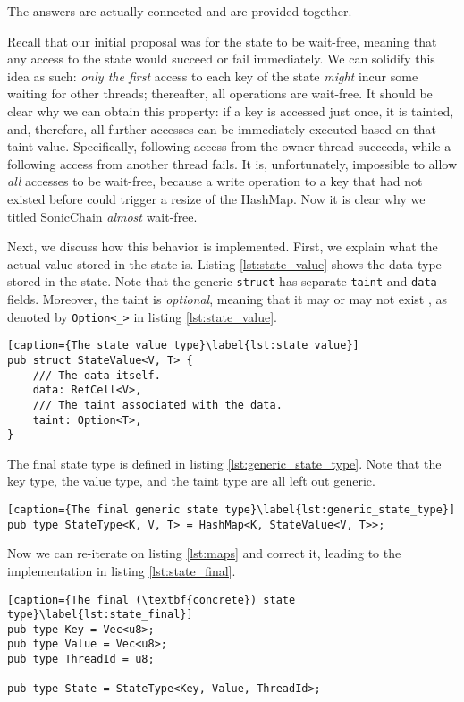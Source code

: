 The answers are actually connected and are provided together.

Recall that our initial proposal was for the state to be wait-free, meaning that any access to the
state would succeed or fail immediately. We can solidify this idea as such: \textit{only the first}
access to each key of the state \textit{might} incur some waiting for other threads; thereafter, all
operations are wait-free. It should be clear why we can obtain this property: if a key is accessed
just once, it is tainted, and, therefore, all further accesses can be immediately executed based on
that taint value. Specifically, following access from the owner thread succeeds, while a following
access from another thread fails. It is, unfortunately, impossible to allow \textit{all} accesses to
be wait-free, because a write operation to a key that had not existed before could trigger a resize
of the HashMap. Now it is clear why we titled SonicChain \textit{almost} wait-free.

Next, we discuss how this behavior is implemented. First, we explain what the actual value stored in
the state is. Listing \ref{lst:state_value} shows the data type stored in the state. Note that the
generic \texttt{struct} has separate \texttt{taint} and \texttt{data} fields. Moreover, the taint is
\textit{optional}, meaning that it may or may not exist , as denoted by \texttt{Option<\_>} in listing \ref{lst:state_value}.

\begin{lstlisting}[caption={The state value type}\label{lst:state_value}]
pub struct StateValue<V, T> {
    /// The data itself.
    data: RefCell<V>,
    /// The taint associated with the data.
    taint: Option<T>,
}
\end{lstlisting}

The final state type is defined in listing \ref{lst:generic_state_type}. Note that the key type, the value
type, and the taint type are all left out generic.

\begin{lstlisting}[caption={The final generic state type}\label{lst:generic_state_type}]
pub type StateType<K, V, T> = HashMap<K, StateValue<V, T>>;
\end{lstlisting}

Now we can re-iterate on listing \ref{lst:maps} and correct it, leading to the implementation in
listing \ref{lst:state_final}.

\begin{lstlisting}[caption={The final (\textbf{concrete}) state type}\label{lst:state_final}]
pub type Key = Vec<u8>;
pub type Value = Vec<u8>;
pub type ThreadId = u8;

pub type State = StateType<Key, Value, ThreadId>;
\end{lstlisting}

